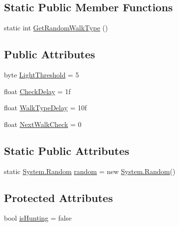 \subsection*{Static Public Member Functions}
\begin{DoxyCompactItemize}
\item 
static int \mbox{\hyperlink{class_entity_zombie_flock_s_d_x_a7c3b7ed327760162b331626c48799388}{Get\+Random\+Walk\+Type}} ()
\end{DoxyCompactItemize}
\subsection*{Public Attributes}
\begin{DoxyCompactItemize}
\item 
byte \mbox{\hyperlink{class_entity_zombie_flock_s_d_x_aa99561b150d788618a9d846aacb880f7}{Light\+Threshold}} = 5
\item 
float \mbox{\hyperlink{class_entity_zombie_flock_s_d_x_aa11d6824c989ca7805fe3332dfcca8fe}{Check\+Delay}} = 1f
\item 
float \mbox{\hyperlink{class_entity_zombie_flock_s_d_x_aaf418adc9576be4d53ba9003b8cfddbd}{Walk\+Type\+Delay}} = 10f
\item 
float \mbox{\hyperlink{class_entity_zombie_flock_s_d_x_afc395fe8dd3fa3a8dcd16ecbbde11184}{Next\+Walk\+Check}} = 0
\end{DoxyCompactItemize}
\subsection*{Static Public Attributes}
\begin{DoxyCompactItemize}
\item 
static \mbox{\hyperlink{_winter_mod_prefab_8cs_a24953b19d956caa76c403684c71b4e5b}{System.\+Random}} \mbox{\hyperlink{class_entity_zombie_flock_s_d_x_a749fc3c22e52e61118810c1e79080a14}{random}} = new \mbox{\hyperlink{_winter_mod_prefab_8cs_a24953b19d956caa76c403684c71b4e5b}{System.\+Random}}()
\end{DoxyCompactItemize}
\subsection*{Protected Attributes}
\begin{DoxyCompactItemize}
\item 
bool \mbox{\hyperlink{class_entity_zombie_flock_s_d_x_aca87b9b53f818f8d8c584350e6c4971b}{is\+Hunting}} = false
\end{DoxyCompactItemize}


